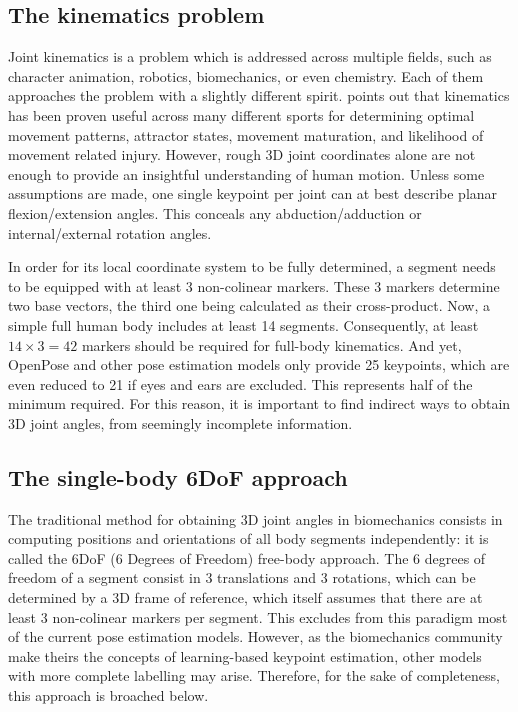 \subsection{The kinematics problem}

Joint kinematics is a problem which is addressed across multiple fields, such as character animation, robotics, biomechanics, or even chemistry. Each of them approaches the problem with a slightly different spirit. \cite{Robertson2013} points out that kinematics has been proven useful across many different sports for determining optimal movement patterns, attractor states, movement maturation, and likelihood of movement related injury. However, rough 3D joint coordinates alone are not enough to provide an insightful understanding of human motion. Unless some assumptions are made, one single keypoint per joint can at best describe planar flexion/extension angles. This conceals any abduction/adduction or internal/external rotation angles. 

In order for its local coordinate system to be fully determined, a segment needs to be equipped with at least 3 non-colinear markers. These 3 markers determine two base vectors, the third one being calculated as their cross-product. Now, a simple full human body includes at least 14 segments. Consequently, at least $14 \times 3 = 42$ markers should be required for full-body kinematics. And yet, OpenPose and other pose estimation models only provide 25 keypoints, which are even reduced to 21 if eyes and ears are excluded. This represents half of the minimum required. For this reason, it is important to find indirect ways to obtain 3D joint angles, from seemingly incomplete information.


\subsection{The single-body 6DoF approach}

The traditional method for obtaining 3D joint angles in biomechanics consists in computing positions and orientations of all body segments independently: it is called the 6DoF (6 Degrees of Freedom) free-body approach. The 6 degrees of freedom of a segment consist in 3 translations and 3 rotations, which can be determined by a 3D frame of reference, which itself assumes that there are at least 3 non-colinear markers per segment. This excludes from this paradigm most of the current pose estimation models. However, as the biomechanics community make theirs the concepts of learning-based keypoint estimation, other models with more complete labelling may arise. Therefore, for the sake of completeness, this approach is broached below.

